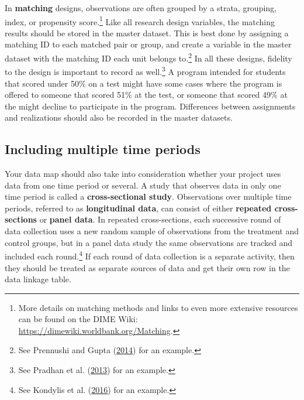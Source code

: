 \documentclass[
]{book}
\begin{document}
In \textbf{matching} designs, observations are often grouped
by a strata, grouping, index, or propensity score.\footnote{More details on matching methods
  and links to even more extensive resources
  can be found on the DIME Wiki:
  \url{https://dimewiki.worldbank.org/Matching}.}
Like all research design variables, the matching results
should be stored in the master dataset.
This is best done by assigning a matching ID
to each matched pair or group,
and create a variable in the master dataset
with the matching ID each unit belongs to.\footnote{See Prennushi and Gupta (\protect\hyperlink{ref-prennushi2014women}{2014}) for an example.}
In all these designs, fidelity to the design is important to record as well.\footnote{See Pradhan et al. (\protect\hyperlink{ref-pradhan2013evaluating}{2013}) for an example.}
A program intended for students that scored under 50\% on a test
might have some cases where the program is offered to someone that scored 51\% at the test,
or someone that scored 49\% at the might decline to participate in the program.
Differences between assignments and realizations
should also be recorded in the master datasets.

\hypertarget{including-multiple-time-periods}{%
\subsection*{Including multiple time periods}\label{including-multiple-time-periods}}

Your data map should also take into consideration
whether your project uses data from one time period or several.
A study that observes data in only one time period is called
a \textbf{cross-sectional study}.
Observations over multiple time periods,
referred to as \textbf{longitudinal data},
can consist of either
\textbf{repeated cross-sections}
or \textbf{panel data}.
In repeated cross-sections,
each successive round of data collection uses a new random sample
of observations from the treatment and control groups,
but in a panel data study
the same observations are tracked and included each round.\footnote{See Kondylis et al. (\protect\hyperlink{ref-kondylis2016female}{2016}) for an example.}
If each round of data collection is a separate activity,
then they should be treated as separate sources of data
and get their own row in the data linkage table.
\end{document}
